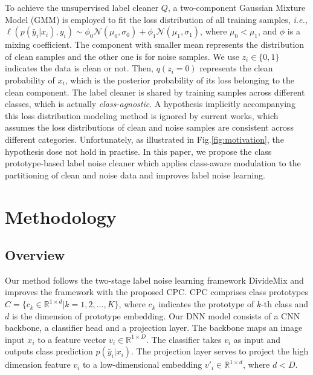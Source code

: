 \documentclass{article} \usepackage{iclr2023_conference,times}
\begin{document}
To achieve the unsupervised label cleaner $Q$, a two-component Gaussian Mixture Model (GMM) is employed to fit the loss distribution of all training samples, \emph{i.e.,} $\ell(p(\tilde{y_i} |x_i), y_i) \sim  \phi_{0}\mathcal{N}(\mu_{0},\sigma_{0})+\phi_{1} \mathcal{N}(\mu_{1},\sigma_{1})$, where $\mu_{0} < \mu_{1}$, and $\phi$ is a mixing coefficient.
The component with smaller mean represents the distribution of clean samples and the other one is for noise samples.
We use $z_i \in \{0,1\}$ indicates the data is clean or not. Then, $q(z_i=0)$ represents the clean probability of $x_i$, which is the posterior probability of its loss belonging to the clean component.  The label cleaner is shared by training samples across different classes, which is actually \textit{class-agnostic}.
A hypothesis implicitly accompanying this loss distribution modeling method is ignored by current works, which assumes the loss distributions of clean and noise samples are consistent across different categories.
Unfortunately, as illustrated in Fig.\ref{fig:motivation}, the  hypothesis dose not hold in practise. In this paper, we propose the class prototype-based label noise cleaner which applies class-aware modulation to the partitioning of clean and noise data and improves label noise learning.

\section{Methodology}


\subsection{Overview} \label{overview}
Our method follows the two-stage label noise learning framework DivideMix \citep{Li2020DivideMixLW} and improves the framework with the proposed CPC. CPC comprises class prototypes $C=\{c_k \in \mathbb{R}^{1 \times d}|k=1,2,...,K\}$, where $c_k$ indicates the prototype of $k$-th class and $d$ is the dimension of prototype embedding.
Our DNN model consists of a CNN backbone, a classifier head and a projection layer. The backbone maps an image input $x_i$ to a feature vector $v_{i} \in \mathbb{R}^{1 \times D}$. The classifier takes $v_{i}$ as input and outputs class prediction $p(\tilde{y_i}|x_i)$. The projection layer serves to project the high dimension feature $v_{i}$ to a low-dimensional embedding $v'_{i} \in \mathbb{R}^{1 \times d}$, where $d < D$. 
\end{document}
